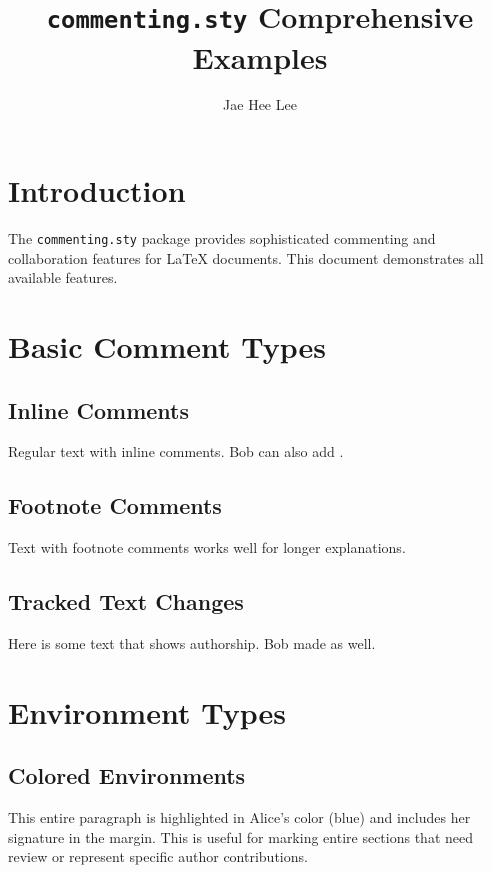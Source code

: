 \documentclass{article}
\title{\texttt{commenting.sty} Comprehensive Examples}
\author{Jae Hee Lee}
\date{}
\begin{document}
\maketitle

\section{Introduction}

The \texttt{commenting.sty} package provides sophisticated commenting and collaboration features for LaTeX documents. This document demonstrates all available features.

\section{Basic Comment Types}

\subsection{Inline Comments}

Regular text with  inline comments. Bob can also add .

\subsection{Footnote Comments}

Text with footnote comments works well for longer explanations.

\subsection{Tracked Text Changes}

Here is some  text that shows authorship. Bob made  as well.

\section{Environment Types}

\subsection{Colored Environments}

\begin{aliceenv}
    This entire paragraph is highlighted in Alice's color (blue) and includes her signature in the margin. This is useful for marking entire sections that need review or represent specific author contributions.
\end{aliceenv}
\end{document}
